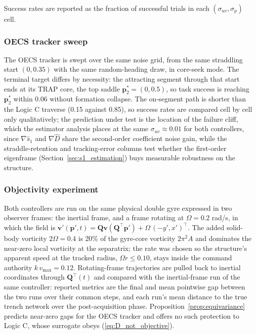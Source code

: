 \documentclass[lettersize,journal]{IEEEtran}
\begin{document}
Success rates are reported as the fraction of successful trials in each
$(\sigma_{uv}, \sigma_p)$ cell.

\subsubsection{OECS tracker sweep}
The OECS tracker is swept over the same noise grid, from the same
straddling start $(0, 0.35)$ with the same random-heading draw, in
core-seek mode. The terminal target differs by necessity: the
attracting segment through that start ends at its TRAP core, the top
saddle $\mathbf{p}^*_2 = (0, 0.5)$, so task success is reaching
$\mathbf{p}^*_2$ within 0.06 without formation collapse. The on-segment
path is shorter than the Logic C traverse (0.15 against 0.85), so
success rates are compared cell by cell only qualitatively; the
prediction under test is the location of the failure cliff, which the
estimator analysis places at the same $\sigma_{uv} \approx 0.01$ for
both controllers, since $\nabla\hat{s}_1$ and $\nabla\hat{D}$ share the
second-order coefficient noise gain, while the straddle-retention and
tracking-error columns test whether the first-order eigenframe
(Section~\ref{sec:s1_estimation}) buys measurable robustness on the
structure.

\subsubsection{Objectivity experiment}
Both controllers are run on the same physical double gyre expressed in
two observer frames: the inertial frame, and a frame rotating at
$\Omega = 0.2$ rad/s, in which the field is
$\mathbf{v}'(\mathbf{p}', t) = \mathbf{Q}\mathbf{v}(\mathbf{Q}^\top
\mathbf{p}') + \Omega\,(-y', x')^\top$. The added solid-body vorticity
$2\Omega = 0.4$ is 20\% of the gyre-core vorticity $2\pi^2 A$ and
dominates the near-zero local vorticity at the separatrix; the rate was
chosen so the structure's apparent speed at the tracked radius,
$\Omega r \leq 0.10$, stays inside the command authority $k\,v_{\max} =
0.12$. Rotating-frame trajectories are pulled back to inertial
coordinates through $\mathbf{Q}^\top(t)$ and compared with the
inertial-frame run of the same controller: reported metrics are the
final and mean pointwise gap between the two runs over their common
steps, and each run's mean distance to the true trench network over the
post-acquisition phase. Proposition~\ref{prop:equivariance} predicts
near-zero gaps for the OECS tracker and offers no such protection to
Logic C, whose surrogate obeys (\ref{eq:D_not_objective}).
\end{document}
